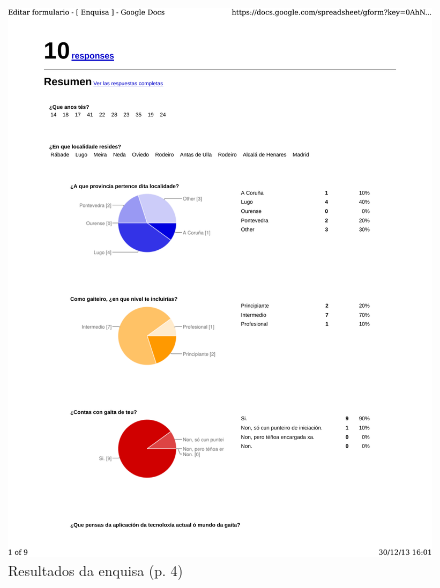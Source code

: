 \begin{figure}
 \centering
 \includegraphics[scale=0.7,page=4,keepaspectratio=true]{./imagenes/enquisa.pdf}
 \caption{Resultados da enquisa (p. 4)}
 \label{figura:ResultadosEnquisa4}
\end{figure}

